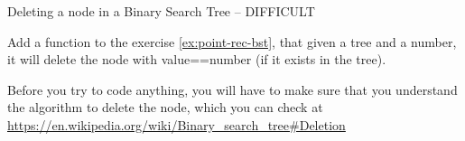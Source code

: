  {Deleting a node in a Binary Search Tree -- DIFFICULT}
\label{ex:point-rec-depth-bst}

Add a function to the exercise \ref{ex:point-rec-bst}, that given a tree and a
number, it will delete the node with value==number (if it exists in the tree).

Before you try to code anything, you will have to make sure that you understand
the algorithm to delete the node, which you can check at
\url{https://en.wikipedia.org/wiki/Binary_search_tree#Deletion}


